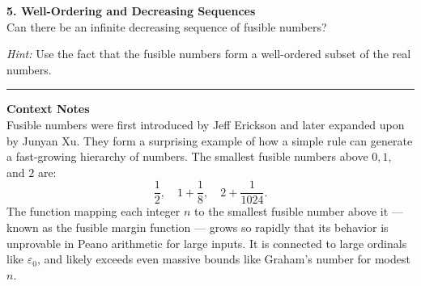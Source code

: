 {\vspace{1em}
\textbf{5. Well-Ordering and Decreasing Sequences} \\
Can there be an infinite decreasing sequence of fusible numbers?

\textit{Hint:} Use the fact that the fusible numbers form a well-ordered subset of the real numbers.

\vspace{2em}
\hrule
\vspace{1em}
\textbf{Context Notes} \\
Fusible numbers were first introduced by Jeff Erickson and later expanded upon by Junyan Xu. They form a surprising example of how a simple rule can generate a fast-growing hierarchy of numbers. The smallest fusible numbers above \( 0, 1, \) and \( 2 \) are:
\[
\frac{1}{2}, \quad 1 + \frac{1}{8}, \quad 2 + \frac{1}{1024}.
\]
The function mapping each integer \( n \) to the smallest fusible number above it — known as the fusible margin function — grows so rapidly that its behavior is unprovable in Peano arithmetic for large inputs. It is connected to large ordinals like \( \varepsilon_0 \), and likely exceeds even massive bounds like Graham’s number for modest \( n \).
}

